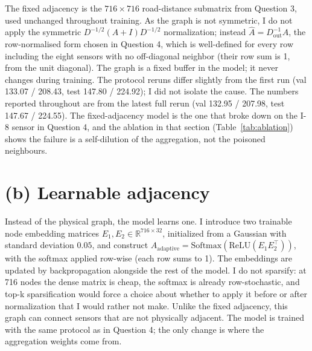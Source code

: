 \documentclass[11pt,letterpaper]{article}
\begin{document}
The fixed adjacency is the $716 \times 716$ road-distance submatrix from Question 3, used
unchanged throughout training. As the graph is not symmetric, I do not apply the symmetric
$D^{-1/2}(A+I)D^{-1/2}$ normalization; instead $\hat{A} = D_{\mathrm{out}}^{-1} A$, the row-normalised
form chosen in Question 4, which is well-defined for every row including the eight sensors
with no off-diagonal neighbor (their row sum is 1, from the unit diagonal). The graph is a
fixed buffer in the model; it never changes during training. The protocol reruns
differ slightly from the first run (val 133.07 / 208.43, test 147.80 / 224.92); I did not
isolate the cause. The numbers reported throughout are from the latest full rerun
(val 132.95 / 207.98, test 147.67 / 224.55).
The fixed-adjacency model is the one that
broke down on the I-8 sensor in Question 4, and the ablation in that section
(Table~\ref{tab:ablation}) shows the failure is a self-dilution of the aggregation,
not the poisoned neighbours.

\section*{(b) Learnable adjacency}

Instead of the physical graph, the model learns one. I introduce two trainable node
embedding matrices $E_1, E_2 \in \mathbb{R}^{716 \times 32}$, initialized from a Gaussian
with standard deviation $0.05$, and construct $A_{\mathrm{adaptive}} = \mathrm{Softmax}(\mathrm{ReLU}(E_1 E_2^{\top}))$,
with the softmax applied row-wise (each row sums to 1). The embeddings are updated by
backpropagation alongside the rest of the model. I do not sparsify: at 716 nodes the dense
matrix is cheap, the softmax is already row-stochastic, and top-k sparsification would force
a choice about whether to apply it before or after normalization that I would rather not
make. Unlike the fixed adjacency, this graph can connect sensors that are not physically
adjacent. The model is trained with the same protocol as in Question 4; the only change is
where the aggregation weights come from.
\end{document}
